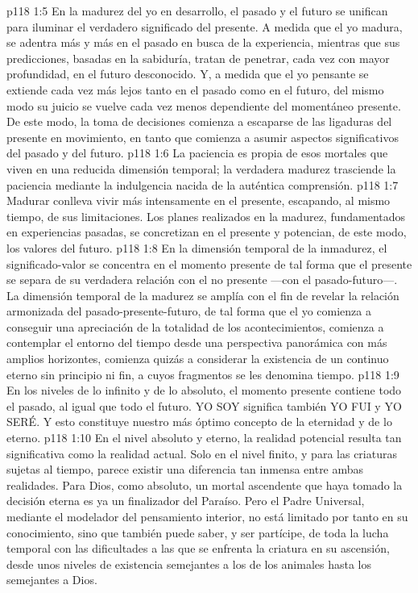 \vs p118 1:5 En la madurez del yo en desarrollo, el pasado y el futuro se unifican para iluminar el verdadero significado del presente. A medida que el yo madura, se adentra más y más en el pasado en busca de la experiencia, mientras que sus predicciones, basadas en la sabiduría, tratan de penetrar, cada vez con mayor profundidad, en el futuro desconocido. Y, a medida que el yo pensante se extiende cada vez más lejos tanto en el pasado como en el futuro, del mismo modo su juicio se vuelve cada vez menos dependiente del momentáneo presente. De este modo, la toma de decisiones comienza a escaparse de las ligaduras del presente en movimiento, en tanto que comienza a asumir aspectos significativos del pasado y del futuro.
\vs p118 1:6 \pc La paciencia es propia de esos mortales que viven en una reducida dimensión temporal; la verdadera madurez trasciende la paciencia mediante la indulgencia nacida de la auténtica comprensión.
\vs p118 1:7 \pc Madurar conlleva vivir más intensamente en el presente, escapando, al mismo tiempo, de sus limitaciones. Los planes realizados en la madurez, fundamentados en experiencias pasadas, se concretizan en el presente y potencian, de este modo, los valores del futuro.
\vs p118 1:8 En la dimensión temporal de la inmadurez, el significado\hyp{}valor se concentra en el momento presente de tal forma que el presente se separa de su verdadera relación con el no presente ---con el pasado\hyp{}futuro---. La dimensión temporal de la madurez se amplía con el fin de revelar la relación armonizada del pasado\hyp{}presente\hyp{}futuro, de tal forma que el yo comienza a conseguir una apreciación de la totalidad de los acontecimientos, comienza a contemplar el entorno del tiempo desde una perspectiva panorámica con más amplios horizontes, comienza quizás a considerar la existencia de un continuo eterno sin principio ni fin, a cuyos fragmentos se les denomina tiempo.
\vs p118 1:9 En los niveles de lo infinito y de lo absoluto, el momento presente contiene todo el pasado, al igual que todo el futuro. YO SOY significa también YO FUI y YO SERÉ. Y esto constituye nuestro más óptimo concepto de la eternidad y de lo eterno.
\vs p118 1:10 En el nivel absoluto y eterno, la realidad potencial resulta tan significativa como la realidad actual. Solo en el nivel finito, y para las criaturas sujetas al tiempo, parece existir una diferencia tan inmensa entre ambas realidades. Para Dios, como absoluto, un mortal ascendente que haya tomado la decisión eterna es ya un finalizador del Paraíso. Pero el Padre Universal, mediante el modelador del pensamiento interior, no está limitado por tanto en su conocimiento, sino que también puede saber, y ser partícipe, de toda la lucha temporal con las dificultades a las que se enfrenta la criatura en su ascensión, desde unos niveles de existencia semejantes a los de los animales hasta los semejantes a Dios.

